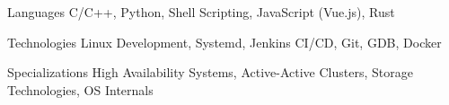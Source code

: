 

\begin{cvskills}

  \cvskill
    {Languages} %
    {C/C++, Python, Shell Scripting, JavaScript (Vue.js), Rust} %

  \cvskill
    {Technologies} %
    {Linux Development, Systemd, Jenkins CI/CD, Git, GDB, Docker} %

  \cvskill
    {Specializations} %
    {High Availability Systems, Active-Active Clusters, Storage Technologies, OS Internals} %

\end{cvskills}